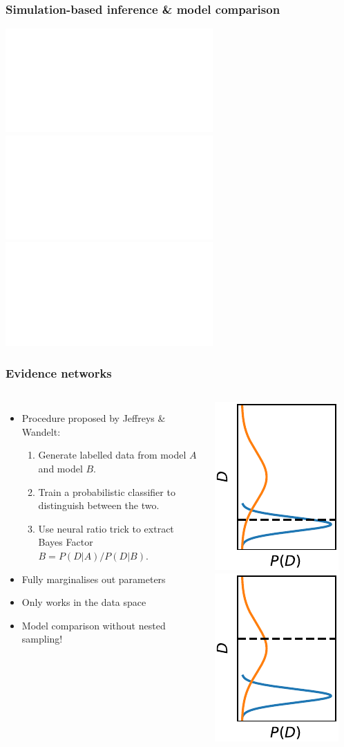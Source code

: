 \documentclass[aspectratio=169]{beamer}
\begin{document}
\begin{frame}
    \frametitle{Simulation-based inference \& model comparison}
    \includegraphics<1>[page=1]{figures/sbi.pdf}%
    \includegraphics<2>[page=2]{figures/sbi.pdf}%
    \includegraphics<3>[page=3]{figures/sbi.pdf}%
\end{frame}

\begin{frame}
    \frametitle{Evidence networks~}
    \begin{columns}
    \begin{itemize}
        \item Procedure proposed by Jeffreys \& Wandelt:
            \begin{enumerate}
                \item Generate labelled data from model $A$ and model $B$.
                \item Train a probabilistic classifier to distinguish between the two.
                \item Use neural ratio trick to extract Bayes Factor $B = P(D|A)/P(D|B)$.
            \end{enumerate}
        \item Fully marginalises out parameters
        \item Only works in the data space
        \item Model comparison without nested sampling!
    \end{itemize}
        
\includegraphics{figures/sbi-0.pdf}
\includegraphics{figures/sbi-1.pdf}
    \end{columns}
\end{frame}
\end{document}
